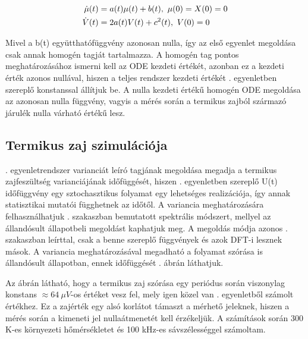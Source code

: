 \begin{align}\label{eqn:noise_stat}
    \centering
    \begin{split}
        \dot{\mu}(t) &= a(t)\mu(t)+b(t),\ \mu(0) = X(0) = 0\\
        \dot{V}(t) &= 2a(t)V(t) + c^2(t),\ V(0) = 0
    \end{split}
\end{align}

Mivel a b(t) együtthatófüggvény azonosan nulla, így az első egyenlet megoldása csak annak homogén tagját tartalmazza. A homogén tag pontos meghatározásához ismerni kell az ODE kezdeti értékét, azonban ez a kezdeti érték azonos nullával, hiszen a teljes rendszer kezdeti értékét . egyenletben szereplő konstanssal állítjuk be. A nulla kezdeti értékű homogén ODE megoldása az azonosan nulla függvény, vagyis a mérés során a termikus zajból származó járulék nulla várható értékű lesz.

\subsection{Termikus zaj szimulációja}

. egyenletrendszer varianciát leíró tagjának megoldása megadja a termikus zajfeszültség varianciájának időfüggését, hiszen . egyenletben szereplő U(t) időfüggvény egy sztochasztikus folyamat egy lehetséges realizációja, így annak statisztikai mutatói függhetnek az időtől. A variancia meghatározására felhasználhatjuk . szakaszban bemutatott spektrális módszert, mellyel az állandósult állapotbeli megoldást kaphatjuk meg. A megoldás módja azonos . szakaszban leírttal, csak a benne szereplő függvények és azok DFT-i lesznek mások. A variancia meghatározásával megadható a folyamat szórása is állandósult állapotban, ennek időfüggését . ábrán láthatjuk.


Az ábrán látható, hogy a termikus zaj szórása egy periódus során viszonylag konstans $\approx 64\ \mu V$-os értéket vesz fel, mely igen közel van . egyenletből számolt értékhez. Ez a zajérték egy alsó korlátot támaszt a mérhető jeleknek, hiszen a mérés során a kimeneti jel nullaátmenetét kell érzékeljük. A számítások során 300 K-es környezeti hőmérsékletet és 100 kHz-es sávszélességgel számoltam.

